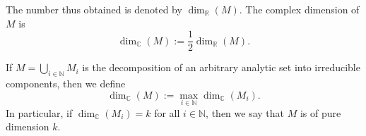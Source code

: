 The number thus obtained is denoted by $\dim_{\mathbb{R}}(M)$. The complex dimension of $M$ is
$$\dim_{\mathbb{C}}(M) := \frac{1}{2} \dim_{\mathbb{R}}(M).$$

If $M = \bigcup_{i \in \mathbb{N}} M_i$ is the decomposition of an arbitrary analytic set into irreducible components, then we define
$$\dim_{\mathbb{C}}(M) := \max_{i \in \mathbb{N}} \dim_{\mathbb{C}}(M_i).$$
In particular, if $\dim_{\mathbb{C}}(M_i) = k$ for all $i \in \mathbb{N}$, then we say that $M$ is of pure dimension $k$.

